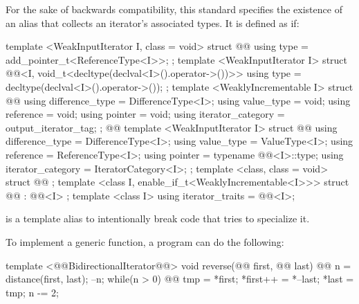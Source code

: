\begin{addedblock}
\pnum
For the sake of backwards compatibility, this standard specifies the existence of an 
alias that collects an iterator's associated types. It is defined as if:


\begin{codeblock}
  template <WeakInputIterator I, class = void> struct @@ {
    using type = add_pointer_t<ReferenceType<I>>;
  };
  template <WeakInputIterator I>
  struct @@<I, void_t<decltype(declval<I>().operator->())>> {
    using type = decltype(declval<I>().operator->());
  };
  template <WeaklyIncrementable I> struct @@ {
    using difference_type = DifferenceType<I>;
    using value_type = void;
    using reference = void;
    using pointer = void;
    using iterator_category = output_iterator_tag;
  };
  @@
  template <WeakInputIterator I> struct @@ {
    using difference_type = DifferenceType<I>;
    using value_type = ValueType<I>;
    using reference = ReferenceType<I>;
    using pointer = typename @@<I>::type;
    using iterator_category = IteratorCategory<I>;
  };
  template <class, class = void> struct @@ { };
  template <class I, enable_if_t<WeaklyIncrementable<I>>>
  struct @@ : @@<I> { };
  template <class I>
    using iterator_traits = @@<I>;
\end{codeblock}

\pnum
\enternote
{} is a template alias to intentionally break code that tries to specialize
it.
\exitnote

\end{addedblock}

\pnum
\enterexample
To implement a generic
function, a \Cpp program can do the following:

\begin{codeblock}
template <@@BidirectionalIterator@@>
void reverse(@@ first, @@ last) {
  @@ n =
    distance(first, last);
  --n;
  while(n > 0) {
    @@
      tmp = *first;
    *first++ = *--last;
    *last = tmp;
    n -= 2;
  }
}
\end{codeblock}
\exitexample

